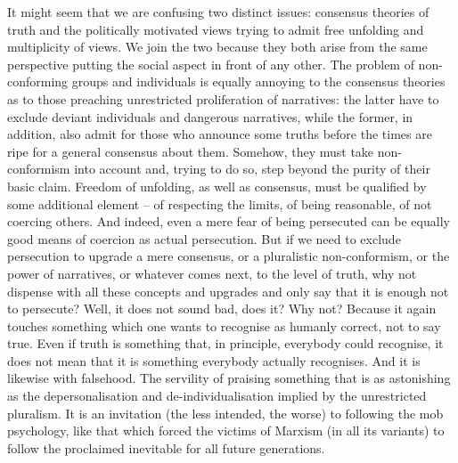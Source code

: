 \pa It might seem that we are confusing two distinct issues: consensus theories
of truth and the politically motivated views trying to admit free unfolding and
multiplicity of views. We join the two because they both arise from the same
perspective putting the social aspect in front of any other.  The problem of
non-conforming groups and individuals is equally annoying to the consensus
theories as to those preaching unrestricted proliferation of narratives: the
latter have to exclude deviant individuals and dangerous narratives, while the
former, in addition, also admit for those who announce some truths before the
times are ripe for a general consensus about them.  Somehow, they must take
non-conformism into account and, trying to do so, step beyond the purity of
their basic claim. Freedom of unfolding, as well as consensus, must be qualified
by some additional element -- of respecting the limits, of being reasonable, of
not coercing others. And indeed, even a mere fear of being persecuted can be
equally good means of coercion as actual persecution.  But if we need to exclude
persecution to upgrade a mere consensus, or a pluralistic non-conformism, or the
power of narratives, or whatever comes next, to the level of truth, why not
dispense with all these concepts and upgrades and only say that it is enough not
to persecute?    Well, it does not sound bad,
does it?  Why not?  Because it again touches something which one wants to
recognise as humanly correct, not to say true. Even if truth is something that,
in principle, everybody could recognise, it does not mean that it is something
everybody actually recognises. And it is likewise with falsehood. The servility
of praising something that  is as astonishing as the depersonalisation and
de-individualisation implied by the unrestricted pluralism.  It is an invitation
(the less intended, the worse) to following the mob psychology, like that which
forced the victims of Marxism (in all its variants) to follow the
 proclaimed inevitable for all future generations.



